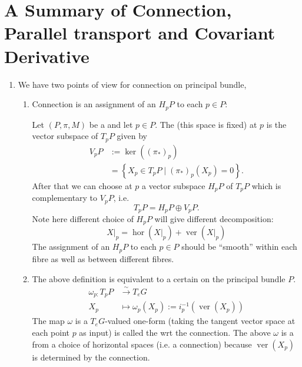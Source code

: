 \documentclass{article}
\begin{document}
\section{A Summary of Connection, Parallel transport and Covariant Derivative}
\begin{enumerate}
\item We have two points of view for connection on principal bundle,
\begin{enumerate}
\item Connection is an  assignment of an   $H_pP$ to each $p\in P$:

Let $(P, \pi, M)$ be a  and let $p \in P$. The  (this space is fixed) at $p$ is the vector subspace of $T_{p} P$ given by
$$
\begin{aligned}
V_{p} P &:=\operatorname{ker}\left(\left(\pi_{*}\right)_{p}\right) \\
&=\left\{X_{p} \in T_{p} P \mid\left(\pi_{*}\right)_{p}\left(X_{p}\right)=0\right\} .
\end{aligned}
$$
After that we can choose  at $p$ a vector subspace $H_{p} P$ of $T_{p} P$ which is complementary to $V_{p} P$, i.e.
$$
T_{p} P=H_{p} P \oplus V_{p} P .
$$
Note here different choice of  $H_pP$ will give different decomposition:
$$\left.X\right|_{p}=\operatorname{hor}\left(\left.X\right|_{p}\right)+\operatorname{ver}\left(\left.X\right|_{p}\right)$$
The assignment of an $H_pP$ to each $p\in P$ should be “smooth” within each fibre as well as between different fibres.
    \item {}
    
    The above definition  is equivalent to a certain  on the principal bundle $P$. 
    $$
\begin{aligned}
\omega_{p:} T_{p} P & \stackrel{\sim}{\longrightarrow} T_{e} G \\
X_{p} & \mapsto \omega_{p}\left(X_{p}\right):=i_{p}^{-1}\left(\operatorname{ver}\left(X_{p}\right)\right)
\end{aligned}
$$
The map $\omega$ is a $T_{e} G$-valued one-form (taking the tangent vector space at each point $p$ as input) is called the  \gls{wrt} the connection. The above  $\omega$  is a  from a choice of horizontal spaces (i.e. a connection) because $\operatorname{ver}\left(X_{p}\right)$ is determined by the connection. 



\end{enumerate}
\end{enumerate}
\end{document}
